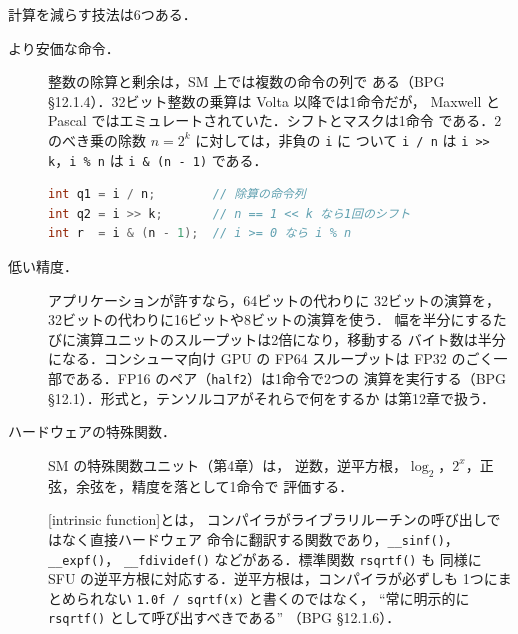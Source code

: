 \documentclass[../main.tex]{subfiles}
\begin{document}
計算を減らす技法は6つある．
\begin{description}
  \item[より安価な命令．]  整数の除算と剰余は，SM 上では複数の命令の列で
    ある（BPG §12.1.4）．32ビット整数の乗算は Volta 以降では1命令だが，
    Maxwell と Pascal ではエミュレートされていた．シフトとマスクは1命令
    である．2のべき乗の除数 $n = 2^k$ に対しては，非負の \texttt{i} に
    ついて \texttt{i / n} は \texttt{i >{}> k}，\texttt{i \% n} は
    \texttt{i \& (n - 1)} である．
\begin{lstlisting}[language=C++, numbers=none]
int q1 = i / n;        // 除算の命令列
int q2 = i >> k;       // n == 1 << k なら1回のシフト
int r  = i & (n - 1);  // i >= 0 なら i % n
\end{lstlisting}
  \item[低い精度．]  アプリケーションが許すなら，64ビットの代わりに
    32ビットの演算を，32ビットの代わりに16ビットや8ビットの演算を使う．
    幅を半分にするたびに演算ユニットのスループットは2倍になり，移動する
    バイト数は半分になる．コンシューマ向け GPU の FP64 スループットは
    FP32 のごく一部である．FP16 のペア（\texttt{half2}）は1命令で2つの
    演算を実行する（BPG §12.1）．形式と，テンソルコアがそれらで何をするか
    は第12章で扱う．
  \item[ハードウェアの特殊関数．]  SM の特殊関数ユニット（第4章）は，
    逆数，逆平方根，$\log_2$，$2^x$，正弦，余弦を，精度を落として1命令で
    評価する．
    \begin{definition}[組み込み関数]
      [intrinsic function]とは，
      コンパイラがライブラリルーチンの呼び出しではなく直接ハードウェア
      命令に翻訳する関数であり，\texttt{\_\_sinf()}，\texttt{\_\_expf()}，
      \texttt{\_\_fdividef()} などがある．標準関数 \texttt{rsqrtf()} も
      同様に SFU の逆平方根に対応する．逆平方根は，コンパイラが必ずしも
      1つにまとめられない \texttt{1.0f / sqrtf(x)} と書くのではなく，
      \enquote{常に明示的に \texttt{rsqrtf()} として呼び出すべきである}
      （BPG §12.1.6）．
    \end{definition}
\begin{lstlisting}[language=C++, numbers=none]

\end{lstlisting}
\end{description}
\end{document}
